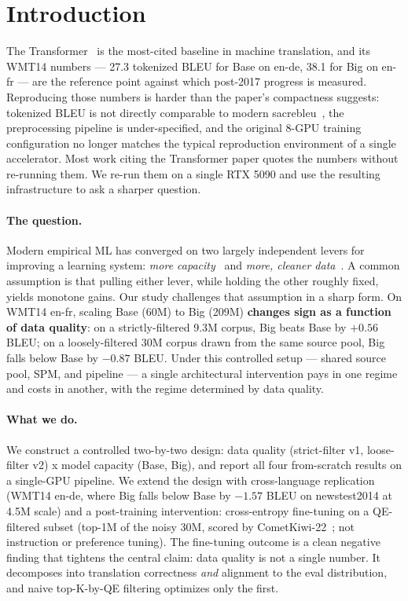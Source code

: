 \section{Introduction}

The Transformer~\cite{vaswani2017attention} is the most-cited baseline in machine translation, and its WMT14 numbers --- 27.3 tokenized BLEU for Base on en-de, 38.1 for Big on en-fr --- are the reference point against which post-2017 progress is measured. Reproducing those numbers is harder than the paper's compactness suggests: tokenized BLEU is not directly comparable to modern sacrebleu~\cite{post2018call}, the preprocessing pipeline is under-specified, and the original 8-GPU training configuration no longer matches the typical reproduction environment of a single accelerator. Most work citing the Transformer paper quotes the numbers without re-running them. We re-run them on a single RTX 5090 and use the resulting infrastructure to ask a sharper question.

\paragraph{The question.}
Modern empirical ML has converged on two largely independent levers for improving a learning system: \emph{more capacity}~\cite{kaplan2020scaling, hoffmann2022chinchilla} and \emph{more, cleaner data}~\cite{penedo2023refinedweb, gururangan2020dont}. A common assumption is that pulling either lever, while holding the other roughly fixed, yields monotone gains. Our study challenges that assumption in a sharp form. On WMT14 en-fr, scaling Base (60M) to Big (209M) \textbf{changes sign as a function of data quality}: on a strictly-filtered 9.3M corpus, Big beats Base by $+0.56$ BLEU; on a loosely-filtered 30M corpus drawn from the same source pool, Big falls below Base by $-0.87$ BLEU. Under this controlled setup --- shared source pool, SPM, and pipeline --- a single architectural intervention pays in one regime and costs in another, with the regime determined by data quality.

\paragraph{What we do.}
We construct a controlled two-by-two design: data quality (strict-filter v1, loose-filter v2) x model capacity (Base, Big), and report all four from-scratch results on a single-GPU pipeline. We extend the design with cross-language replication (WMT14 en-de, where Big falls below Base by $-1.57$ BLEU on newstest2014 at 4.5M scale) and a post-training intervention: cross-entropy fine-tuning on a QE-filtered subset (top-1M of the noisy 30M, scored by CometKiwi-22~\cite{rei2022cometkiwi}; not instruction or preference tuning). The fine-tuning outcome is a clean negative finding that tightens the central claim: data quality is not a single number. It decomposes into translation correctness \emph{and} alignment to the eval distribution, and naive top-K-by-QE filtering optimizes only the first.

